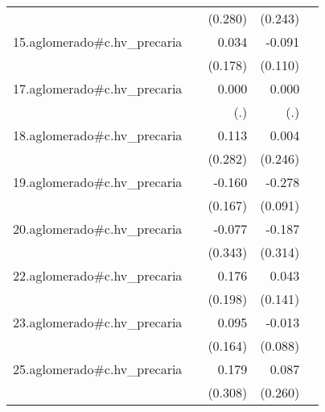 {\begin{longtable}{l*{4}{D{.}{.}{-1}}}
            &                     &     (0.280)         &     (0.243)         &                     \\
\addlinespace
15.aglomerado#c.hv\_precaria&                     &       0.034         &      -0.091         &                     \\
            &                     &     (0.178)         &     (0.110)         &                     \\
\addlinespace
17.aglomerado#c.hv\_precaria&                     &       0.000         &       0.000         &                     \\
            &                     &         (.)         &         (.)         &                     \\
\addlinespace
18.aglomerado#c.hv\_precaria&                     &       0.113         &       0.004         &                     \\
            &                     &     (0.282)         &     (0.246)         &                     \\
\addlinespace
19.aglomerado#c.hv\_precaria&                     &      -0.160         &      -0.278\sym{**} &                     \\
            &                     &     (0.167)         &     (0.091)         &                     \\
\addlinespace
20.aglomerado#c.hv\_precaria&                     &      -0.077         &      -0.187         &                     \\
            &                     &     (0.343)         &     (0.314)         &                     \\
\addlinespace
22.aglomerado#c.hv\_precaria&                     &       0.176         &       0.043         &                     \\
            &                     &     (0.198)         &     (0.141)         &                     \\
\addlinespace
23.aglomerado#c.hv\_precaria&                     &       0.095         &      -0.013         &                     \\
            &                     &     (0.164)         &     (0.088)         &                     \\
\addlinespace
25.aglomerado#c.hv\_precaria&                     &       0.179         &       0.087         &                     \\
            &                     &     (0.308)         &     (0.260)         &                     \\

\end{longtable}}
